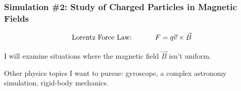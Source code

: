\documentclass{beamer}
\begin{document}

\begin{frame}

\frametitle{Simulation \#2:  Study of Charged Particles in Magnetic Fields}

 $$ \mbox{Lorentz Force Law:  \hspace{1cm}}  F =    q \vec{v} \times \vec{B}$$

\vspace{.5cm}

I will examine situations where the magnetic field $ \vec{B} $ isn't uniform.  
\end{frame}


\begin{frame}

Other physics topics I want to pursue:  gyroscope, a complex astronomy simulation, rigid-body mechanics.   










\end{frame}


%
%
%
%
\end{document}
